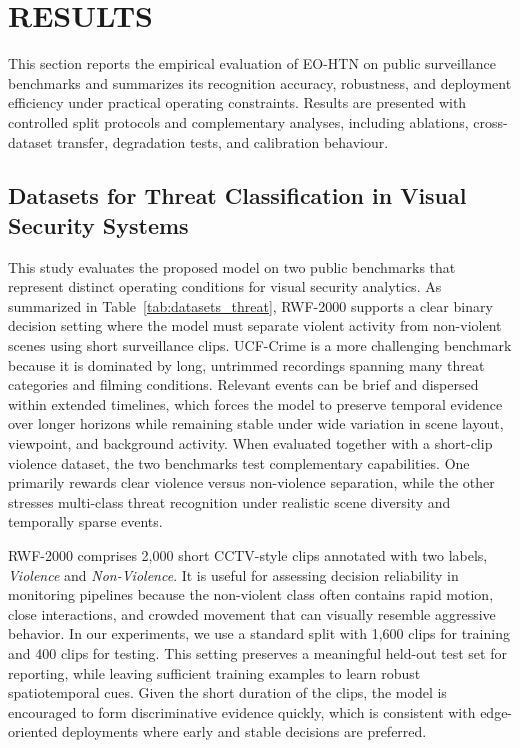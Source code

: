 \documentclass[AMA,Times1COL]{WileyNJDv5} %
\begin{document}
\section{RESULTS}
This section reports the empirical evaluation of EO-HTN on public surveillance benchmarks and summarizes its recognition accuracy, robustness, and deployment efficiency under practical operating constraints. Results are presented with controlled split protocols and complementary analyses, including ablations, cross-dataset transfer, degradation tests, and calibration behaviour.


\subsection{Datasets for Threat Classification in Visual Security Systems}
This study evaluates the proposed model on two public benchmarks that represent distinct operating conditions for visual security analytics. As summarized in Table~\ref{tab:datasets_threat}, RWF-2000 supports a clear binary decision setting where the model must separate violent activity from non-violent scenes using short surveillance clips. UCF-Crime is a more challenging benchmark because it is dominated by long, untrimmed recordings spanning many threat categories and filming conditions. Relevant events can be brief and dispersed within extended timelines, which forces the model to preserve temporal evidence over longer horizons while remaining stable under wide variation in scene layout, viewpoint, and background activity. When evaluated together with a short-clip violence dataset, the two benchmarks test complementary capabilities. One primarily rewards clear violence versus non-violence separation, while the other stresses multi-class threat recognition under realistic scene diversity and temporally sparse events.

RWF-2000 comprises 2{,}000 short CCTV-style clips annotated with two labels, \textit{Violence} and \textit{Non-Violence}. It is useful for assessing decision reliability in monitoring pipelines because the non-violent class often contains rapid motion, close interactions, and crowded movement that can visually resemble aggressive behavior. In our experiments, we use a standard split with 1{,}600 clips for training and 400 clips for testing. This setting preserves a meaningful held-out test set for reporting, while leaving sufficient training examples to learn robust spatiotemporal cues. Given the short duration of the clips, the model is encouraged to form discriminative evidence quickly, which is consistent with edge-oriented deployments where early and stable decisions are preferred.
\end{document}
